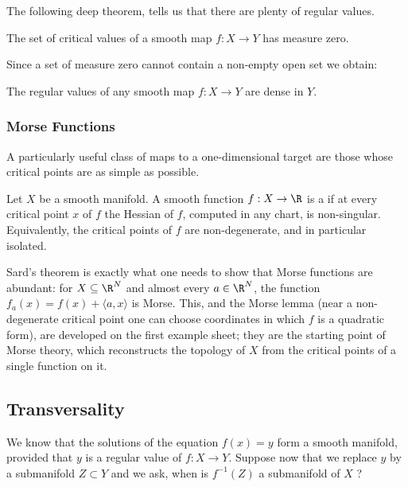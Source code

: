 The following deep theorem, tells us that there are plenty of regular values.

\begin{theorem}
    The set of critical values of a smooth map $f: X \rightarrow Y$ has measure zero.
\end{theorem}

Since a set of measure zero cannot contain a non-empty open set we obtain:

\begin{corollary}
    The regular values of any smooth map $f: X \rightarrow Y$ are dense in $Y$.
\end{corollary}

\subsubsection{Morse Functions}

A particularly useful class of maps to a one-dimensional target are those whose critical points are as simple as possible.

\begin{definition}
    Let $X$ be a smooth manifold. A smooth function $f: X \rightarrow \R$ is a  if at every critical point $x$ of $f$ the Hessian of $f$, computed in any chart, is non-singular. Equivalently, the critical points of $f$ are non-degenerate, and in particular isolated.
\end{definition}

Sard's theorem is exactly what one needs to show that Morse functions are abundant: for $X \subseteq \R^N$ and almost every $a \in \R^N$, the function $f_a(x) = f(x) + \langle a, x\rangle$ is Morse. This, and the Morse lemma (near a non-degenerate critical point one can choose coordinates in which $f$ is a quadratic form), are developed on the first example sheet; they are the starting point of Morse theory, which reconstructs the topology of $X$ from the critical points of a single function on it.


\subsection{Transversality}

We know that the solutions of the equation $f(x)=y$ form a smooth manifold, provided that $y$ is a regular value of $f: X \rightarrow Y$. Suppose now that we replace $y$ by a submanifold $Z \subset Y$ and we ask, when is $f^{-1}(Z)$ a submanifold of $X$ ?

